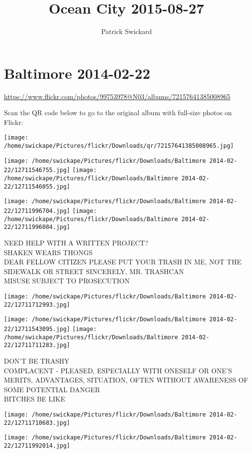 \documentclass[10pt,letterpaper]{article}
\title{Ocean City 2015-08-27}
\author{Patrick Swickard}
\date{}
\begin{document}
\section*{Baltimore 2014-02-22}

\url{https://www.flickr.com/photos/99753978@N03/albums/72157641385008965}

Scan the QR code below to go to the original album with full-size photos on Flickr:

\texttt{[image: /home/swickape/Pictures/flickr/Downloads/qr/72157641385008965.jpg]}
\pagebreak

\texttt{[image: /home/swickape/Pictures/flickr/Downloads/Baltimore 2014-02-22/12711546755.jpg]}
\texttt{[image: /home/swickape/Pictures/flickr/Downloads/Baltimore 2014-02-22/12711546055.jpg]}

\texttt{[image: /home/swickape/Pictures/flickr/Downloads/Baltimore 2014-02-22/12711996704.jpg]}
\texttt{[image: /home/swickape/Pictures/flickr/Downloads/Baltimore 2014-02-22/12711996084.jpg]}

NEED HELP WITH A WRITTEN PROJECT?\\
SHAKEN WEARS THONGS\\
DEAR FELLOW CITIZEN PLEASE PUT YOUR TRASH IN ME, NOT THE SIDEWALK OR STREET SINCERELY, MR. TRASHCAN\\
MISUSE SUBJECT TO PROSECUTION
\pagebreak

\texttt{[image: /home/swickape/Pictures/flickr/Downloads/Baltimore 2014-02-22/12711712993.jpg]}

\vspace{0.25in}
\texttt{[image: /home/swickape/Pictures/flickr/Downloads/Baltimore 2014-02-22/12711543095.jpg]}
\texttt{[image: /home/swickape/Pictures/flickr/Downloads/Baltimore 2014-02-22/12711711283.jpg]}

DON'T BE TRASHY\\
COMPLACENT {-} PLEASED, ESPECIALLY WITH ONESELF OR ONE'S MERITS, ADVANTAGES, SITUATION, OFTEN WITHOUT AWARENESS OF SOME POTENTIAL DANGER\\
BITCHES BE LIKE
\pagebreak

\texttt{[image: /home/swickape/Pictures/flickr/Downloads/Baltimore 2014-02-22/12711710683.jpg]}

\vspace{0.25in}
\texttt{[image: /home/swickape/Pictures/flickr/Downloads/Baltimore 2014-02-22/12711992014.jpg]}
\end{document}
